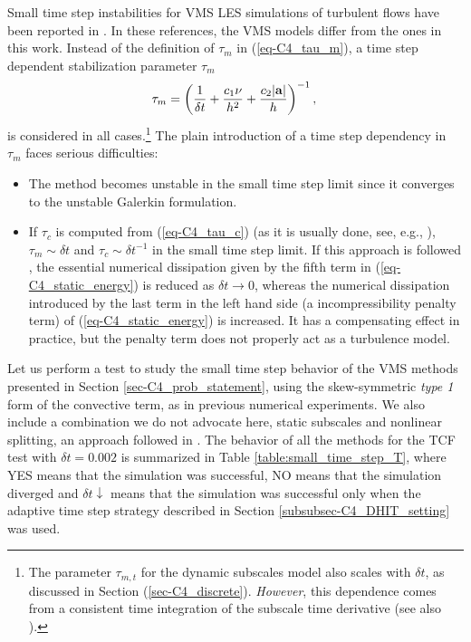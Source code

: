 Small time step instabilities for VMS LES simulations of turbulent flows have been reported in \cite{Hsu2010,gamnitzer_time-dependent_2010}. In these references, the VMS models differ from the ones in this work. Instead of the definition of  $\tau_m$ in (\ref{eq-C4_tau_m}), a time step dependent stabilization parameter $\tau_m$
$$
\tau_m=\left(\frac{1}{\delta t} + \frac{c_1\nu}{h^2}+\frac{c_2|{\bf a}|}{h}\right)^{-1},\\
$$
is considered in all cases.\footnote{The parameter $\tau_{m,t}$ for the dynamic subscales model also
scales with $\delta t$, as discussed in Section (\ref{sec-C4_discrete}). {\it However}, this dependence comes from a consistent time integration of the subscale time derivative (see also \cite[Section 3.2]{codina_time_2007}).} The plain introduction of a time step dependency in $\tau_m$ faces serious difficulties:
\begin{itemize}
\item The method becomes unstable in the small time step limit since it converges to the unstable Galerkin formulation.
\item If $\tau_c$ is computed from (\ref{eq-C4_tau_c}) (as it is usually done, see, e.g., \cite{bazilevs_variational_2007,Hsu2010,gamnitzer_time-dependent_2010,gravemeier_algebraic_2010}), $\tau_m \sim \delta t$ and $\tau_c \sim \delta t^{-1}$ in the small time step limit. If this approach is followed , the essential numerical dissipation given by the fifth term in (\ref{eq-C4_static_energy}) is reduced as $\delta t \to 0$, whereas the numerical dissipation introduced by the last term in the left hand side (a incompressibility penalty term) of (\ref{eq-C4_static_energy}) is increased. It has a compensating effect in practice, but the penalty term does not properly act as a turbulence model. %
\end{itemize}

Let us perform a test to study the small time step behavior of the VMS methods presented in Section \ref{sec-C4_prob_statement}, using the skew-symmetric \textit{type 1} form of the convective term, as in previous numerical experiments. We also include a combination we do not advocate here, static subscales and nonlinear splitting, an approach followed in \cite{Calo_2004,bazilevs_variational_2007,Hsu2010,gamnitzer_time-dependent_2010,gravemeier_algebraic_2010}. %
The behavior of all the methods for the TCF test with $\delta t=0.002$ is summarized in Table \ref{table:small_time_step_T}, where YES means that the simulation was successful, NO means that the simulation diverged and $\delta t\downarrow$ means that the simulation was successful only when the adaptive time step strategy described in Section \ref{subsubsec-C4_DHIT_setting} was used.

